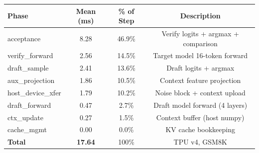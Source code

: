 \centering
\begin{tabular}{l|ccc}
\toprule
Phase & Mean (ms) & \% of Step & Description \\
\midrule
acceptance & 8.28 & 46.9\% & Verify logits + argmax + comparison \\
verify\_forward & 2.56 & 14.5\% & Target model 16-token forward \\
draft\_sample & 2.41 & 13.6\% & Draft logits + argmax \\
aux\_projection & 1.86 & 10.5\% & Context feature projection \\
host\_device\_xfer & 1.79 & 10.2\% & Noise block + context upload \\
draft\_forward & 0.47 & 2.7\% & Draft model forward (4 layers) \\
ctx\_update & 0.27 & 1.5\% & Context buffer (host numpy) \\
cache\_mgmt & 0.00 & 0.0\% & KV cache bookkeeping \\
\midrule
\textbf{Total} & \textbf{17.64} & 100\% & TPU v4, GSM8K \\
\bottomrule
\end{tabular}
